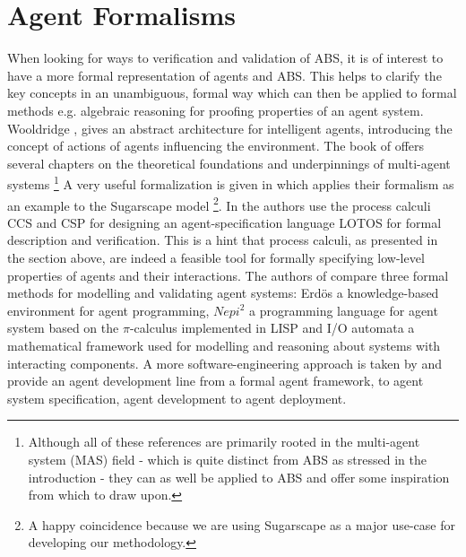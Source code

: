 \section{Agent Formalisms}
When looking for ways to verification and validation of ABS, it is of interest to have a more formal representation of agents and ABS. This helps to clarify the key concepts in an unambiguous, formal way which can then be applied to formal methods e.g. algebraic reasoning for proofing properties of an agent system. Wooldridge \cite{wooldridge_introduction_2009}, \cite{wooldridge_intelligent_1995} gives an abstract architecture for intelligent agents, introducing the concept of actions of agents influencing the environment. The book of \cite{weiss_multiagent_2013} offers several chapters on the theoretical foundations and underpinnings of multi-agent systems \footnote{Although all of these references are primarily rooted in the multi-agent system (MAS) field - which is quite distinct from ABS as stressed in the introduction - they can as well be applied to ABS and offer some inspiration from which to draw upon.}
A very useful formalization is given in \cite{klugl_amason:_2013} which applies their formalism as an example to the Sugarscape model \cite{epstein_growing_1996} \footnote{A happy coincidence because we are using Sugarscape as a major use-case for developing our methodology.}.
In \cite{carchiolo_using_2000} the authors use the process calculi CCS and CSP for designing an agent-specification language LOTOS for formal description and verification. This is a hint that process calculi, as presented in the section above, are indeed a feasible tool for formally specifying low-level properties of agents and their interactions.
The authors of \cite{araragi_formal_2000} compare three formal methods for modelling and validating agent systems: Erdös a knowledge-based environment for agent programming, $Nepi^2$ a programming language for agent system based on the $\pi$-calculus implemented in LISP and I/O automata a mathematical framework used for modelling and reasoning about systems with interacting components.
A more software-engineering approach is taken by \cite{dinverno_formal_2000} and provide an agent development line from a formal agent framework, to agent system specification, agent development to agent deployment. 